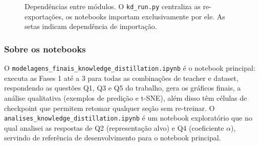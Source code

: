 \documentclass[
  article,            %
  11pt,               %
  letterpaper,        %
  oneside,            %
  sumario = tradicional
]{abntex2}
\begin{document}
\begin{figure}[htbp]
\caption{Dependências entre módulos. O \texttt{kd\_run.py} centraliza as re-exportações, os notebooks importam exclusivamente por ele. As setas indicam dependência de importação.}
\label{fig:dependencias_modulos}
\end{figure}

\subsubsection{Sobre os notebooks}
O \texttt{modelagens\_finais\_knowledge\_distillation.ipynb} é o notebook principal: executa as Fases 1 até a 3 para todas as combinações de teacher e dataset, respondendo as
questões Q1, Q3 e Q5 do trabalho, gera os gráficos finais, a análise qualitativa (exemplos
de predição e t-SNE), além disso têm células de checkpoint que
permitem retomar qualquer seção sem re-treinar. O
\texttt{analises\_knowledge\_distillation.ipynb} é um notebook exploratório que
no qual analisei as respostas de Q2 (representação alvo) e Q4 (coeficiente $\alpha$), servindo de referência de desenvolvimento para o notebook principal.
\end{document}
